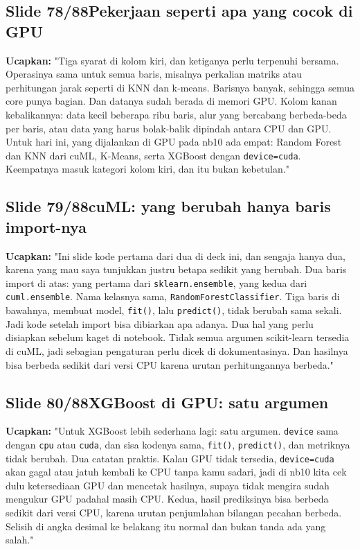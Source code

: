 \documentclass[11pt]{article}
\renewcommand{\framebox}[1]{\colorbox{acc!15}{\textcolor{acc}{\textbf{#1}}}}
\begin{document}
\subsection*{\framebox{Slide 78/88}\quad Pekerjaan seperti apa yang cocok di GPU}
\textbf{Ucapkan:} "Tiga syarat di kolom kiri, dan ketiganya perlu terpenuhi bersama. Operasinya sama untuk semua baris, misalnya perkalian matriks atau perhitungan jarak seperti di KNN dan k-means. Barisnya banyak, sehingga semua core punya bagian. Dan datanya sudah berada di memori GPU. Kolom kanan kebalikannya: data kecil beberapa ribu baris, alur yang bercabang berbeda-beda per baris, atau data yang harus bolak-balik dipindah antara CPU dan GPU. Untuk hari ini, yang dijalankan di GPU pada nb10 ada empat: Random Forest dan KNN dari cuML, K-Means, serta XGBoost dengan \texttt{device=\textquotedbl{}cuda\textquotedbl{}}. Keempatnya masuk kategori kolom kiri, dan itu bukan kebetulan."\\[2pt]

\subsection*{\framebox{Slide 79/88}\quad cuML: yang berubah hanya baris import-nya}
\textbf{Ucapkan:} "Ini slide kode pertama dari dua di deck ini, dan sengaja hanya dua, karena yang mau saya tunjukkan justru betapa sedikit yang berubah. Dua baris import di atas: yang pertama dari \texttt{sklearn.ensemble}, yang kedua dari \texttt{cuml.ensemble}. Nama kelasnya sama, \texttt{RandomForestClassifier}. Tiga baris di bawahnya, membuat model, \texttt{fit()}, lalu \texttt{predict()}, tidak berubah sama sekali. Jadi kode setelah import bisa dibiarkan apa adanya. Dua hal yang perlu disiapkan sebelum kaget di notebook. Tidak semua argumen scikit-learn tersedia di cuML, jadi sebagian pengaturan perlu dicek di dokumentasinya. Dan hasilnya bisa berbeda sedikit dari versi CPU karena urutan perhitungannya berbeda."\\[2pt]

\subsection*{\framebox{Slide 80/88}\quad XGBoost di GPU: satu argumen}
\textbf{Ucapkan:} "Untuk XGBoost lebih sederhana lagi: satu argumen. \texttt{device} sama dengan \texttt{cpu} atau \texttt{cuda}, dan sisa kodenya sama, \texttt{fit()}, \texttt{predict()}, dan metriknya tidak berubah. Dua catatan praktis. Kalau GPU tidak tersedia, \texttt{device=\textquotedbl{}cuda\textquotedbl{}} akan gagal atau jatuh kembali ke CPU tanpa kamu sadari, jadi di nb10 kita cek dulu ketersediaan GPU dan mencetak hasilnya, supaya tidak mengira sudah mengukur GPU padahal masih CPU. Kedua, hasil prediksinya bisa berbeda sedikit dari versi CPU, karena urutan penjumlahan bilangan pecahan berbeda. Selisih di angka desimal ke belakang itu normal dan bukan tanda ada yang salah."\\[2pt]
\end{document}
